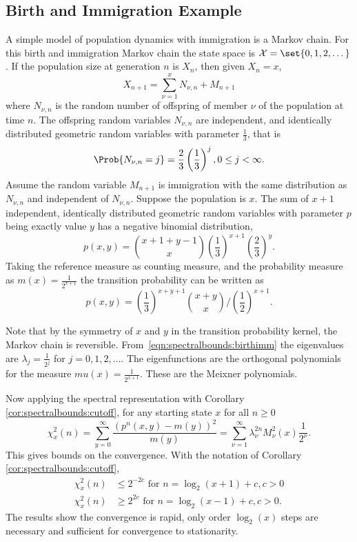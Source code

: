 \documentclass[12pt]{article}
\begin{document}
\subsection*{Birth and Immigration Example}

A simple model of population dynamics with immigration is a Markov
chain.  For this birth and immigration Markov chain the state space is \(
\mathcal{X} = \set{0, 1,2, \dots} \).  If the population size at
generation \( n \) is \( X_n \), then given \( X_n = x \),
\[
    X_{n+1} = \sum\limits_{\nu=1}^x N_{\nu,n} + M_{n+1}
\] where \( N_{\nu,n} \) is the random number of offspring of member \(
\nu \) of the population at time \( n \).  The offspring random
variables \( N_ {\nu,n} \) are independent, and identically distributed
geometric random variables with parameter \( \frac{1}{3} \), that is
\[
    \Prob{N_{\nu,n} = j} = \frac{2}{3}\left( \frac{1}{3} \right)^{j}, 0
    \le j < \infty.
\] Assume the random variable \( M_{n+1} \) is immigration with the same
distribution as \( N_{\nu, n} \) and independent of \( N_{\nu, n} \).
Suppose the population is \( x \).  The sum of \( x + 1 \) independent,
identically distributed geometric random variables with parameter \( p \)
being exactly value \( y \) has a negative binomial distribution,
\[
    p(x,y) = \binom{x + 1 + y -1}{x}\left( \frac{1}{3} \right)^{x+1}
    \left( \frac{2}{3} \right)^{y}.
\] Taking the reference measure as counting measure, and the probability
measure as \( m(x) = \frac{1}{2^{x+1}} \) the transition probability can
be written as
\begin{equation}
    p(x,y) = \left( \frac{1}{3} \right)^{x+y+1} \binom{x+y}{x}\slash
    \left( \frac{1}{2} \right)^{x+1}.%
    \label{eqn:spectralbounds:birthimm}
\end{equation}

Note that by the symmetry of \( x \) and \( y \) in the transition
probability kernel, the Markov chain is reversible.  From~\eqref{eqn:spectralbounds:birthimm}
the eigenvalues are \( \lambda_j = \frac{1}{2^j} \) for \( j = 0,1,2,
\dots \).  The eigenfunctions are the orthogonal polynomials for the
measure \( mu(x) = \frac{1}{2^{x+1}} \).  These are the Meixner
polynomials.

Now applying the spectral representation with Corollary~%
\ref{cor:spectralbounds:cutoff}, for any starting state \( x \) for all \(
n \ge 0 \)
\[
    \chi^2_x(n) = \sum\limits_{y=0}^{\infty} \frac{(p^n(x,y) - m(y))^2}
    {m(y)} = \sum\limits_{\nu=1}^{\infty} \lambda_{\nu}^{2n} M_{\nu}^2(x)
    \frac{1} {2^{\nu}}.
\] This gives bounds on the convergence.  With the notation of
Corollary~%
\ref{cor:spectralbounds:cutoff},
\begin{align*}
    \chi^2_x(n) &\le 2^{-2c} \text{ for } n = \log_2(x+1) + c, c >0 \\
    \chi^2_x(n) &\ge 2^{2c} \text{ for } n= \log_2(x-1) + c, c >0.
\end{align*}
The results show the convergence is rapid, only order \( \log_2(x) \)
steps are necessary and sufficient for convergence to stationarity.
\end{document}
